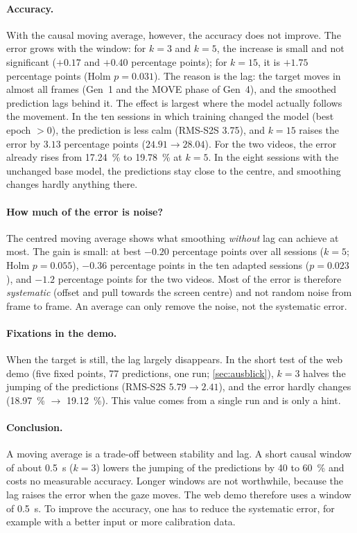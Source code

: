 \paragraph{Accuracy.} With the causal moving average, however, the accuracy
does not improve. The error grows with the window: for $k=3$ and $k=5$, the
increase is small and not significant ($+0.17$ and $+0.40$ percentage points);
for $k=15$, it is $+1.75$ percentage points (Holm $p=0.031$). The reason is the
lag: the target moves in almost all frames (Gen~1 and the MOVE phase of Gen~4),
and the smoothed prediction lags behind it. The effect is largest where the
model actually follows the movement. In the ten sessions in which training
changed the model (best epoch $>0$), the prediction is less calm (RMS-S2S
\num{3.75}), and $k=15$ raises the error by $3.13$ percentage points
($24.91 \rightarrow 28.04$). For the two videos, the error already rises from
\SI{17.24}{\percent} to \SI{19.78}{\percent} at $k=5$. In the eight sessions
with the unchanged base model, the predictions stay close to the centre, and
smoothing changes hardly anything there.

\paragraph{How much of the error is noise?} The centred moving average shows
what smoothing \emph{without} lag can achieve at most. The gain is small: at
best $-0.20$ percentage points over all sessions ($k=5$; Holm $p=0.055$),
$-0.36$ percentage points in the ten adapted sessions ($p=0.023$), and $-1.2$
percentage points for the two videos. Most of the error is therefore
\emph{systematic} (offset and pull towards the screen centre) and not random
noise from frame to frame. An average can only remove the noise, not the
systematic error.

\paragraph{Fixations in the demo.} When the target is still, the lag largely
disappears. In the short test of the web demo (five fixed points,
\num{77} predictions, one run; \cref{sec:ausblick}), $k=3$ halves the jumping
of the predictions (RMS-S2S $5.79 \rightarrow 2.41$), and the error hardly
changes (\SI{18.97}{\percent} $\rightarrow$ \SI{19.12}{\percent}). This value
comes from a single run and is only a hint.

\paragraph{Conclusion.} A moving average is a trade-off between stability and
lag. A short causal window of about \SI{0.5}{\second} ($k=3$) lowers the jumping
of the predictions by \SI{40}{} to \SI{60}{\percent} and costs no measurable
accuracy. Longer windows are not worthwhile, because the lag raises the error
when the gaze moves. The web demo therefore uses a window of
\SI{0.5}{\second}. To improve the accuracy, one has to reduce the systematic
error, for example with a better input or more calibration data.

